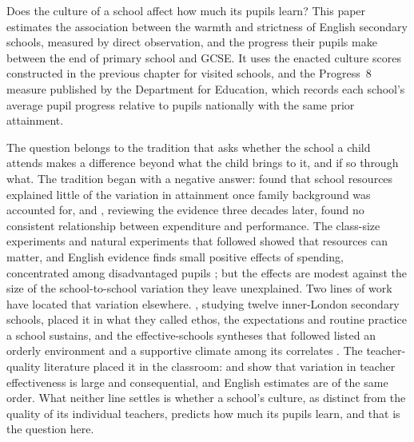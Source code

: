 Does the culture of a school affect how much its pupils learn? This paper
estimates the association between the warmth and strictness of English
secondary schools, measured by direct observation, and the progress their
pupils make between the end of primary school and GCSE. It uses the enacted
culture scores constructed in the previous chapter for \NTierOne{} visited
schools, and the Progress~8 measure published by the Department for
Education, which records each school's average pupil progress relative to
pupils nationally with the same prior attainment.

The question belongs to the tradition that asks whether the school a child
attends makes a difference beyond what the child brings to it, and if so
through what. The tradition began with a negative answer: \citet{coleman1966}
found that school resources explained little of the variation in attainment
once family background was accounted for, and \citet{hanushek1997}, reviewing
the evidence three decades later, found no consistent relationship between
expenditure and performance. The class-size experiments and natural
experiments that followed \citep{krueger1999,krueger2001,angrist1999} showed
that resources can matter, and English evidence finds small positive effects
of spending, concentrated among disadvantaged pupils
\citep{levacic2005,jenkins2006,holmlund2010,machin2010}; but the effects are
modest against the size of the school-to-school variation they leave
unexplained. Two lines of work have located that variation elsewhere.
\citet{rutter1979}, studying twelve inner-London secondary schools, placed it
in what they called ethos, the expectations and routine practice a school
sustains, and the effective-schools syntheses that followed listed an orderly
environment and a supportive climate among its correlates
\citep{edmonds1979,sammons1995,teddlie2000}. The teacher-quality literature
placed it in the classroom: \citet{rivkin2005} and \citet{chetty2014} show
that variation in teacher effectiveness is large and consequential, and
English estimates \citep{slater2012,murphy2011} are of the same order. What
neither line settles is whether a school's culture, as distinct from the
quality of its individual teachers, predicts how much its pupils learn, and
that is the question here.

